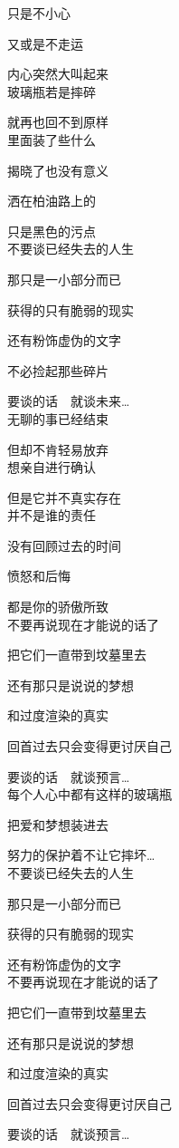只是不小心

又或是不走运

内心突然大叫起来
\\

玻璃瓶若是摔碎

就再也回不到原样
\\

里面装了些什么

揭晓了也没有意义

洒在柏油路上的

只是黑色的污点
\\

不要谈已经失去的人生

那只是一小部分而已

获得的只有脆弱的现实

还有粉饰虚伪的文字

不必捡起那些碎片

要谈的话　就谈未来…
\\

无聊的事已经结束

但却不肯轻易放弃
\\

想亲自进行确认

但是它并不真实存在
\\

并不是谁的责任

没有回顾过去的时间

愤怒和后悔

都是你的骄傲所致
\\

不要再说现在才能说的话了

把它们一直带到坟墓里去

还有那只是说说的梦想

和过度渲染的真实

回首过去只会变得更讨厌自己

要谈的话　就谈预言…
\\

每个人心中都有这样的玻璃瓶

把爱和梦想装进去

努力的保护着不让它摔坏…
\\

不要谈已经失去的人生

那只是一小部分而已

获得的只有脆弱的现实

还有粉饰虚伪的文字
\\

不要再说现在才能说的话了

把它们一直带到坟墓里去

还有那只是说说的梦想

和过度渲染的真实

回首过去只会变得更讨厌自己

要谈的话　就谈预言…
\\
